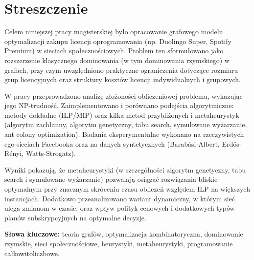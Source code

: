 \section*{Streszczenie}

Celem niniejszej pracy magisterskiej było opracowanie grafowego modelu optymalizacji zakupu licencji oprogramowania (np. Duolingo Super, Spotify Premium) w sieciach społecznościowych. Problem ten sformułowano jako rozszerzenie klasycznego dominowania (w tym dominowania rzymskiego) w grafach, przy czym uwzględniono praktyczne ograniczenia dotyczące rozmiaru grup licencyjnych oraz struktury kosztów licencji indywidualnych i grupowych.

W pracy przeprowadzono analizę złożoności obliczeniowej problemu, wykazując jego NP-trudność. Zaimplementowano i porównano podejścia algorytmiczne: metody dokładne (ILP/MIP) oraz kilka metod przybliżonych i metaheurystyk (algorytm zachłanny, algorytm genetyczny, tabu search, symulowane wyżarzanie, ant colony optimization). Badania eksperymentalne wykonano na rzeczywistych ego-sieciach Facebooka oraz na danych syntetycznych (Barabási-Albert, Erdős-Rényi, Watts-Strogatz).

Wyniki pokazują, że metaheurystyki (w szczególności algorytm genetyczny, tabu search i symulowane wyżarzanie) pozwalają osiągać rozwiązania bliskie optymalnym przy znacznym skróceniu czasu obliczeń względem ILP na większych instancjach. Dodatkowo przeanalizowano wariant dynamiczny, w którym sieć ulega zmianom w czasie, oraz wpływ polityk cenowych i dodatkowych typów planów subskrypcyjnych na optymalne decyzje.

\textbf{Słowa kluczowe:} teoria grafów, optymalizacja kombinatoryczna, dominowanie rzymskie, sieci społecznościowe, heurystyki, metaheurystyki, programowanie całkowitoliczbowe.
